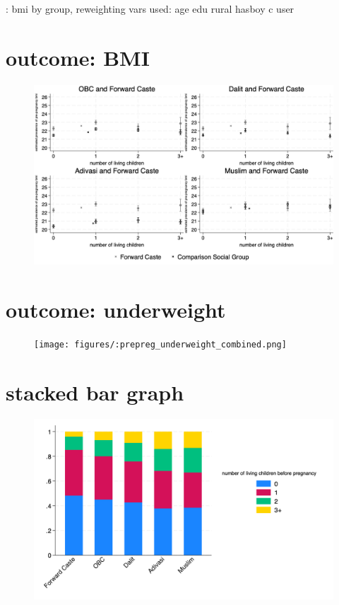 \documentclass{article}
\begin{document}
\begin{table}[H]
    \centering
    \footnotesize %
    \caption{: bmi by group, reweighting vars used: age edu rural hasboy c user}
    \label{tab:sumstat}
\end{table}



\section{outcome: BMI}
\begin{figure}[H]
    \centering
    \includegraphics[width=\textwidth]{figures/prepreg_bmi_combined.png}
\end{figure}

\section{outcome: underweight}
\begin{figure}[H]
    \centering
    \texttt{[image: figures/:prepreg\_underweight\_combined.png]}
\end{figure}

\section{stacked bar graph}
\begin{figure}[H]
    \centering
    \includegraphics[width=\textwidth]{figures/stackedbar_parity_socialgroup.png}
\end{figure}
\end{document}
